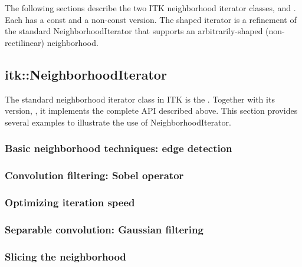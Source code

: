 {The following sections describe the two ITK neighborhood iterator classes,
 and .
Each has a const and a non-const version.  The shaped iterator is a refinement
of the standard NeighborhoodIterator that supports an
arbitrarily-shaped (non-rectilinear) neighborhood.

\subsection{itk::NeighborhoodIterator}
\label{sec:itkNeighborhoodIterator}

The standard neighborhood iterator class in ITK is the
.  Together with its  version,
, it implements the complete API
described above.  This section provides several examples to illustrate the use
of NeighborhoodIterator.

\subsubsection{Basic neighborhood techniques: edge detection}
\label{sec:NeighborhoodExample1}


\subsubsection{Convolution filtering: Sobel operator}
\label{sec:NeighborhoodExample2}


\subsubsection{Optimizing iteration speed}
\label{sec:NeighborhoodExample3}


\subsubsection{Separable convolution: Gaussian filtering}
\label{sec:NeighborhoodExample4}


\subsubsection{Slicing the neighborhood}
\label{sec:NeighborhoodExample5}


}
